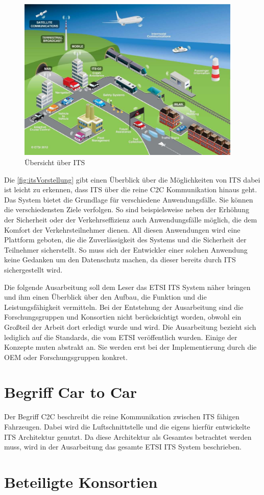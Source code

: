 \begin{figure}[h]
	\includegraphics[width=0.95\textwidth]{content/images/00_einleitung/ETSI_ITS_09_2012.jpg}
	\caption{Übersicht über ITS \cite{ITS_vorstellung}}
	\label{fig:itsVorstellung}
\end{figure}

Die \autoref{fig:itsVorstellung} gibt einen Überblick über die Möglichkeiten von \ac{ITS} dabei ist leicht zu erkennen, dass \ac{ITS} über die reine \ac{C2C} Kommunikation hinaus geht. Das System bietet die Grundlage für verschiedene Anwendungsfälle. Sie können die verschiedensten Ziele verfolgen. So sind beispielsweise neben der Erhöhung der Sicherheit oder der Verkehrseffizienz auch Anwendungsfälle möglich, die dem Komfort der Verkehrsteilnehmer dienen. All diesen Anwendungen wird eine Plattform geboten, die die Zuverlässigkeit des Systems und die Sicherheit der Teilnehmer sicherstellt. So muss sich der Entwickler einer solchen Anwendung keine Gedanken um den Datenschutz machen, da dieser bereits durch \ac{ITS} sichergestellt wird.

Die folgende Ausarbeitung soll dem Leser das \ac{ETSI} \ac{ITS} System näher bringen und ihm einen Überblick über den Aufbau, die Funktion und die Leistungsfähigkeit vermitteln. Bei der Entstehung der Ausarbeitung sind die Forschungsgruppen und Konsortien nicht berücksichtigt worden, obwohl ein Großteil der Arbeit dort erledigt wurde und wird. Die Ausarbeitung bezieht sich lediglich auf die Standards, die vom \ac{ETSI} veröffentlich wurden. Einige der Konzepte muten abstrakt an. Sie werden erst bei der Implementierung durch die \ac{OEM} oder Forschungsgruppen konkret.

\section{Begriff Car to Car}
Der Begriff \ac{C2C} beschreibt die reine Kommunikation zwischen \ac{ITS} fähigen Fahrzeugen. Dabei wird die Luftschnittstelle und die eigens hierfür entwickelte \ac{ITS} Architektur genutzt. Da diese Architektur als Gesamtes betrachtet werden muss, wird in der Ausarbeitung das gesamte \ac{ETSI} \ac{ITS} System beschrieben.  



\section{Beteiligte Konsortien}

